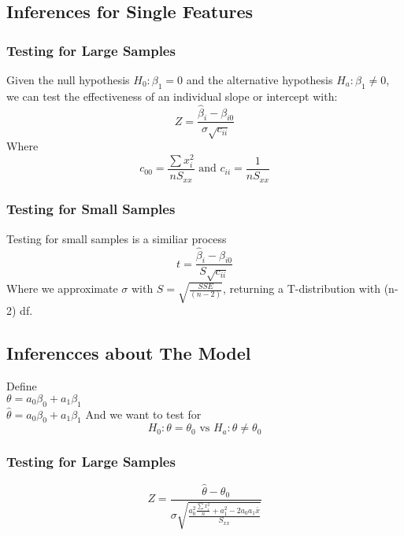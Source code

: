 \documentclass[sn-mathphys,Numbered]{sn-jnl}%
\begin{document}
\subsection{Inferences for Single Features}\label{linear-hypothesis}
\subsubsection{Testing for Large Samples}
Given the null hypothesis $H_0: \beta_1 = 0$ and the alternative hypothesis
$H_a: \beta_1 \neq 0$, we can test the effectiveness of an individual slope or
intercept with:\\
\begin{equation}
    Z = \frac{\hat \beta_i - \beta_{i0}}{\sigma \sqrt{c_{ii}}}
\end{equation}
Where
\begin{equation}
    c_{00} = \frac{\sum x_i^2}{nS_{xx}} \text{ and } c_{ii} = \frac{1}{nS_{xx}}
\end{equation}
\subsubsection{Testing for Small Samples}
Testing for small samples is a similiar process
\begin{equation}
    t = \frac{\hat \beta_i - \beta_{i0}}{S\sqrt{c_{ii}}}
\end{equation}
Where we approximate $\sigma$ with $S = \sqrt{\frac{SSE}{(n-2)}}$, returning a T-distribution with (n-2) df.
\subsection{Inferencces about The Model}\label{linear-model-hypothesis}
Define \\ $\theta = a_0\beta_0 + a_1\beta_1$ \\ $\hat \theta = a_0\beta_0 +
    a_1\beta_1$ And we want to test for
\begin{equation}
    H_0: \theta = \theta_0 \text{ vs } H_a: \theta \neq \theta_0
    \nonumber
\end{equation}
\subsubsection{Testing for Large Samples}
\begin{equation}
    Z = \frac{\hat \theta - \theta_0}
    {\sigma \sqrt{\frac{a_0^2{\frac{\sum x_i^2}{n}} + a_1^2 - 2a_0a_1 \bar x}{S_{xx}}}}
\end{equation}
\end{document}
